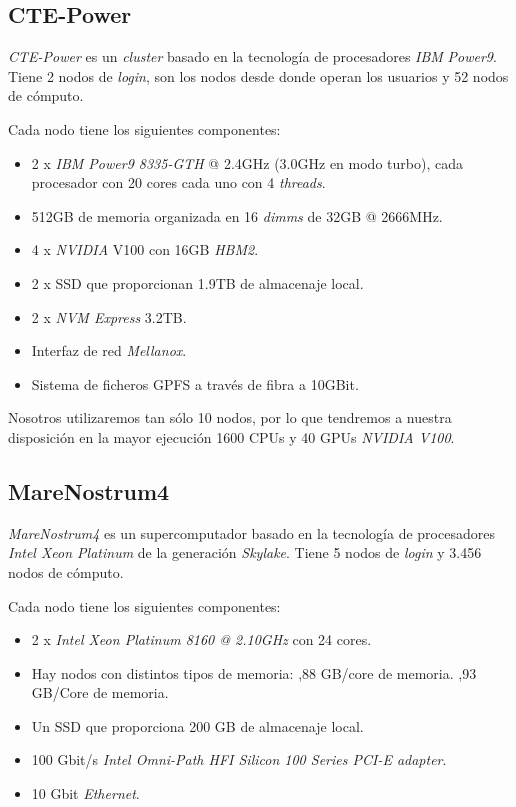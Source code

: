\subsection{CTE-Power}
\label{sec:power}

\textit{CTE-Power} es un \textit{cluster} basado en la tecnología de procesadores \textit{IBM} \textit{Power9}. Tiene 2 nodos de \textit{login}, son los nodos desde donde operan los usuarios y 52 nodos de cómputo. 
\par\smallskip
Cada nodo tiene los siguientes componentes:
\par\smallskip
\begin{itemize}
	\item 2 x \textit{IBM Power9 8335-GTH} @ 2.4GHz (3.0GHz en modo turbo), cada procesador con 20 cores cada uno con 4 \textit{threads}.
	\item 512GB de memoria organizada en 16 \textit{dimms} de 32GB @ 2666MHz.
	\item 4 x \textit{NVIDIA} V100 con 16GB \textit{HBM2}.
	\item 2 x SSD que proporcionan 1.9TB de almacenaje local.
	\item 2 x \textit{NVM Express} 3.2TB.
	\item Interfaz de red \textit{Mellanox}.
	\item Sistema de ficheros GPFS a través de fibra a 10GBit.
\end{itemize}

Nosotros utilizaremos tan sólo 10 nodos, por lo que tendremos a nuestra disposición en la mayor ejecución 1600 CPUs y 40 GPUs \textit{NVIDIA V100}. 

\subsection{MareNostrum4}
\label{sec:mare}

\textit{MareNostrum4} es un supercomputador basado en la tecnología de procesadores \textit{Intel Xeon Platinum} de la generación \textit{Skylake}. Tiene 5 nodos de \textit{login} y 3.456 nodos de cómputo.
\par\smallskip
Cada nodo tiene los siguientes componentes:
\par\smallskip
\begin{itemize}
	\item 2 x \textit{Intel Xeon Platinum 8160 @ 2.10GHz} con 24 cores.
	\item Hay nodos con distintos tipos de memoria:
		,88 GB/core de memoria. %
		,93 GB/Core de memoria.
	\item Un SSD que proporciona 200 GB de almacenaje local.
	\item 100 Gbit/s \textit{Intel Omni-Path HFI Silicon 100 Series PCI-E adapter}.
	\item 10 Gbit \textit{Ethernet}.
\end{itemize}

